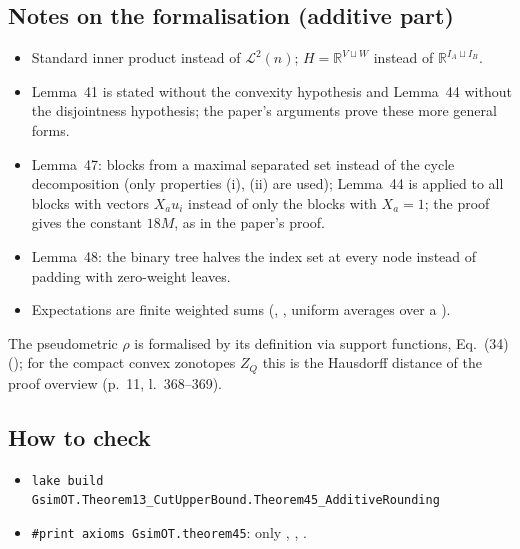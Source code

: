 \subsection{Notes on the formalisation (additive part)}
\begin{itemize}
\item Standard inner product instead of $\mathcal L^2(n)$; $H=\mathbb R^{V\sqcup W}$ instead of $\mathbb R^{I_A\sqcup I_B}$.
\item Lemma~41 is stated without the convexity hypothesis and Lemma~44 without the disjointness hypothesis;
  the paper's arguments prove these more general forms.
\item Lemma~47: blocks from a maximal separated set instead of the cycle decomposition (only properties (i), (ii)
  are used); Lemma~44 is applied to all blocks with vectors $X_au_i$ instead of only the blocks with $X_a=1$;
  the proof gives the constant $18M$, as in the paper's proof.
\item Lemma~48: the binary tree halves the index set at every node instead of padding with zero-weight leaves.
\item Expectations are finite weighted sums (, , uniform averages over a ).
\end{itemize}
The pseudometric $\rho$ is formalised by its definition via support functions, Eq.~(34) (); for the
compact convex zonotopes $Z_Q$ this is the Hausdorff distance of the proof overview (p.~11, l.~368--369).

\subsection{How to check}
\begin{itemize}
\item \texttt{lake build GsimOT.Theorem13\_CutUpperBound.Theorem45\_AdditiveRounding}
\item \texttt{\#print axioms GsimOT.theorem45}: only , , .
\end{itemize}
